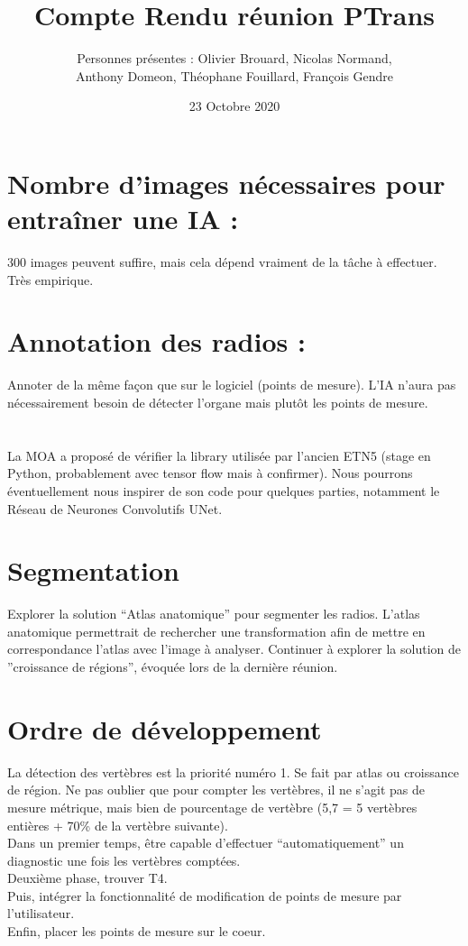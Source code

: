 \documentclass{article}
\title{Compte Rendu réunion PTrans}
\date{23 Octobre 2020}
\author{Personnes présentes : Olivier Brouard, Nicolas Normand,\\ Anthony Domeon, Théophane Fouillard, François Gendre}
\begin{document}
\maketitle
\section*{Nombre d’images nécessaires pour entraîner une IA :}
	300 images peuvent suffire, mais cela dépend vraiment de la tâche à effectuer. Très empirique.

\section*{Annotation des radios :	}
	Annoter de la même façon que sur le logiciel (points de mesure). L’IA n’aura pas nécessairement besoin de détecter l’organe mais plutôt les points de mesure.

\section*{}
La MOA a proposé de vérifier la library utilisée par l’ancien ETN5 (stage en Python, probablement avec tensor flow mais à  confirmer). Nous pourrons éventuellement nous inspirer de son code pour quelques parties, notamment le Réseau de Neurones Convolutifs UNet.

\section*{Segmentation}
Explorer la solution “Atlas anatomique” pour segmenter les radios. L’atlas anatomique permettrait de rechercher une transformation afin de mettre en correspondance l’atlas avec l’image à analyser. 
Continuer à explorer la solution de ”croissance de régions”, évoquée lors de la dernière réunion. 

\section*{Ordre de développement}
La détection des vertèbres est la priorité numéro 1. Se fait par atlas ou croissance de région.  Ne pas oublier que pour compter les vertèbres, il ne s’agit pas de mesure métrique, mais bien de pourcentage de vertèbre (5,7 = 5 vertèbres entières + 70\% de la vertèbre suivante).\\
Dans un premier temps, être capable d’effectuer “automatiquement” un diagnostic une fois les vertèbres comptées.\\
Deuxième phase, trouver T4.\\
Puis, intégrer la fonctionnalité de modification de points de mesure par l’utilisateur.\\
Enfin, placer les points de mesure sur le coeur. 
\end{document}
